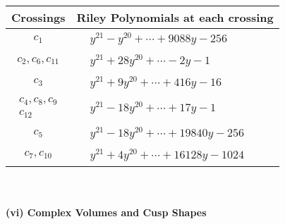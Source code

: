 \documentclass[1p]{elsarticle_modified}
\theoremstyle{definition}
\begin{document}
\begin{tabular}{m{50pt}|m{274pt}}
Crossings & \hspace{64pt}Riley Polynomials at each crossing \\
\hline $$\begin{aligned}c_{1}\end{aligned}$$&$\begin{aligned}
&y^{21}- y^{20}+\cdots+9088 y-256
\end{aligned}$\\
\hline $$\begin{aligned}c_{2},c_{6},c_{11}\end{aligned}$$&$\begin{aligned}
&y^{21}+28 y^{20}+\cdots-2 y-1
\end{aligned}$\\
\hline $$\begin{aligned}c_{3}\end{aligned}$$&$\begin{aligned}
&y^{21}+9 y^{20}+\cdots+416 y-16
\end{aligned}$\\
\hline $$\begin{aligned}c_{4},c_{8},c_{9}\\c_{12}\end{aligned}$$&$\begin{aligned}
&y^{21}-18 y^{20}+\cdots+17 y-1
\end{aligned}$\\
\hline $$\begin{aligned}c_{5}\end{aligned}$$&$\begin{aligned}
&y^{21}-18 y^{20}+\cdots+19840 y-256
\end{aligned}$\\
\hline $$\begin{aligned}c_{7},c_{10}\end{aligned}$$&$\begin{aligned}
&y^{21}+4 y^{20}+\cdots+16128 y-1024
\end{aligned}$\\
\hline
\end{tabular}\\~\\
\newpage\flushleft \textbf{(vi) Complex Volumes and Cusp Shapes}
\end{document}
